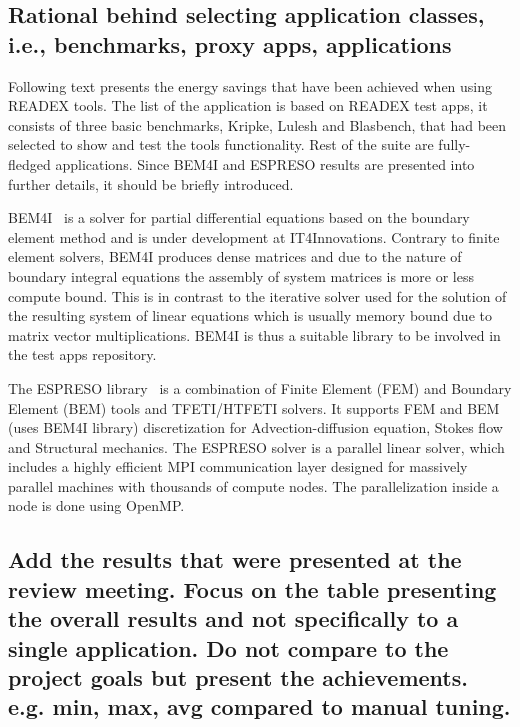 

\subsection{Rational behind selecting application classes, i.e., benchmarks, proxy apps, applications}
Following text presents the energy savings that have been achieved when using READEX tools. The list of the application is based on READEX test apps, it consists of three basic benchmarks, Kripke, Lulesh and Blasbench, that had been selected to show and test the tools functionality. Rest of the suite are fully-fledged applications. Since BEM4I and ESPRESO results are presented into further details, it should be briefly introduced. 

BEM4I~\cite{ch6_MerZap2013} is a solver for partial differential equations based on the boundary element method and is under development at IT4Innovations. Contrary to finite element solvers, BEM4I produces dense matrices and due to the nature of boundary integral equations the assembly of system matrices is more or less compute bound. This is in contrast to the iterative solver used for the solution of the resulting system of linear equations which is usually memory bound due to matrix vector multiplications. BEM4I is thus a suitable library to be involved in the test apps repository.

The ESPRESO library~\cite{ESPRESOijhpca} is a combination of Finite Element (FEM) and Boundary Element (BEM) tools and TFETI/HTFETI solvers. It supports FEM and BEM (uses BEM4I library) discretization for Advection-diffusion equation, Sto\-kes flow and Structural mechanics. The ESPRESO solver is a parallel linear solver, which includes a highly efficient MPI communication layer designed for massively parallel machines with thousands of compute nodes. The parallelization inside a node is done using OpenMP.


\subsection{Add the results that were presented at the review meeting. Focus on the table presenting the overall results and not specifically to a single application. Do not compare to the project goals but present the achievements. e.g. min, max, avg compared to manual tuning.}


